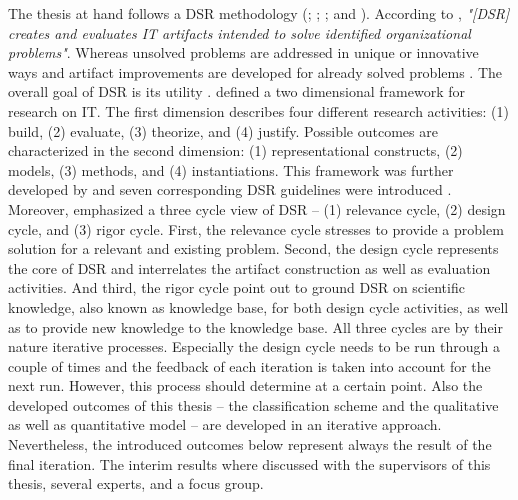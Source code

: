 The thesis at hand follows a \acf{DSR} methodology (\citealp{March1995}; \citealp{Hevner2004}; \citealp{Hevner2007}; and \citealp{Peffers2007}). According to \citet[p. 77]{Hevner2004}, \textit{"[\ac{DSR}] creates and evaluates IT artifacts intended to solve identified organizational problems"}. Whereas unsolved problems are addressed in unique or innovative ways and artifact improvements are developed for already solved problems \citep[p. 81]{Hevner2004}. The overall goal of \ac{DSR} is its utility \citep[p. 80]{Hevner2004}. \citet[pp. 255-262]{March1995} defined a two dimensional framework for research on \ac{IT}. The first dimension describes four different research activities: (1) build, (2) evaluate, (3) theorize, and (4) justify. Possible outcomes are characterized in the second dimension: (1) representational constructs, (2) models, (3) methods, and (4) instantiations. This framework was further developed by \citet[pp. 78-81]{Hevner2004} and seven corresponding \ac{DSR} guidelines were introduced \citep[pp. 82-90]{Hevner2004}. Moreover, \citet[pp. 87-92]{Hevner2007} emphasized a three cycle view of \ac{DSR} -- (1) relevance cycle, (2) design cycle, and (3) rigor cycle. First, the relevance cycle stresses to provide a problem solution for a relevant and existing problem. Second, the design cycle represents the core of \ac{DSR} and interrelates the artifact construction as well as evaluation activities. And third, the rigor cycle point out to ground \ac{DSR} on scientific knowledge, also known as knowledge base, for both design cycle activities, as well as to provide new knowledge to the knowledge base. All three cycles are by their nature iterative processes. Especially the design cycle needs to be run through a couple of times and the feedback of each iteration is taken into account for the next run. However, this process should determine at a certain point. Also the developed outcomes of this thesis -- the classification scheme and the qualitative as well as quantitative model -- are developed in an iterative approach. Nevertheless, the introduced outcomes below represent always the result of the final iteration. The interim results where discussed with the supervisors of this thesis, several experts, and a focus group.

